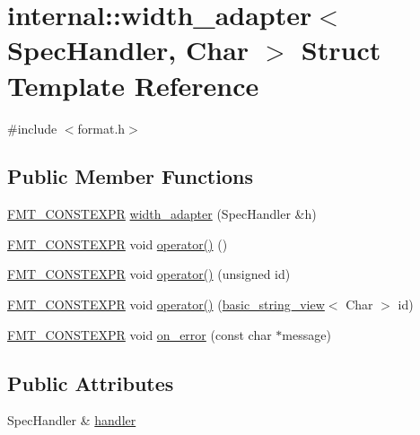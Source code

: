 \hypertarget{structinternal_1_1width__adapter}{}\section{internal\+:\+:width\+\_\+adapter$<$ Spec\+Handler, Char $>$ Struct Template Reference}
\label{structinternal_1_1width__adapter}


{\ttfamily \#include $<$format.\+h$>$}

\subsection*{Public Member Functions}
\begin{DoxyCompactItemize}
\item 
\hyperlink{core_8h_a69201cb276383873487bf68b4ef8b4cd}{F\+M\+T\+\_\+\+C\+O\+N\+S\+T\+E\+X\+PR} \hyperlink{structinternal_1_1width__adapter_affad3de03545cec8aafc5f21f0f3c893}{width\+\_\+adapter} (Spec\+Handler \&h)
\item 
\hyperlink{core_8h_a69201cb276383873487bf68b4ef8b4cd}{F\+M\+T\+\_\+\+C\+O\+N\+S\+T\+E\+X\+PR} void \hyperlink{structinternal_1_1width__adapter_ac2a2429eeed8b2839a59b9f4976a75e7}{operator()} ()
\item 
\hyperlink{core_8h_a69201cb276383873487bf68b4ef8b4cd}{F\+M\+T\+\_\+\+C\+O\+N\+S\+T\+E\+X\+PR} void \hyperlink{structinternal_1_1width__adapter_acb535674b492750d589bd4f08abe48b2}{operator()} (unsigned id)
\item 
\hyperlink{core_8h_a69201cb276383873487bf68b4ef8b4cd}{F\+M\+T\+\_\+\+C\+O\+N\+S\+T\+E\+X\+PR} void \hyperlink{structinternal_1_1width__adapter_af45e17b7c094f2fb2f072ba3d6a50d2c}{operator()} (\hyperlink{classbasic__string__view}{basic\+\_\+string\+\_\+view}$<$ Char $>$ id)
\item 
\hyperlink{core_8h_a69201cb276383873487bf68b4ef8b4cd}{F\+M\+T\+\_\+\+C\+O\+N\+S\+T\+E\+X\+PR} void \hyperlink{structinternal_1_1width__adapter_a93f45903aeec44f631fb6748a477a2c7}{on\+\_\+error} (const char $\ast$message)
\end{DoxyCompactItemize}
\subsection*{Public Attributes}
\begin{DoxyCompactItemize}
\item 
Spec\+Handler \& \hyperlink{structinternal_1_1width__adapter_a59aef299a378b11fca5f9f46ebfd63b2}{handler}
\end{DoxyCompactItemize}


